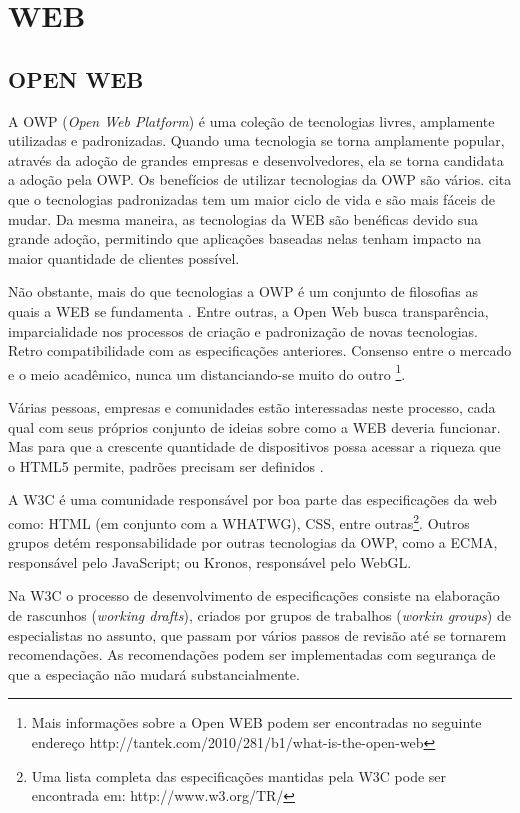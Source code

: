 \section{WEB}

\subsection{OPEN WEB}

A OWP (\textit{Open Web Platform}) é uma coleção de tecnologias
livres, amplamente utilizadas e padronizadas. Quando uma tecnologia
se torna amplamente popular, através da adoção de grandes empresas
e desenvolvedores, ela se torna candidata a adoção pela OWP. Os
benefícios de utilizar tecnologias da OWP são vários. \cite[pp.
3]{svgTime} cita que o tecnologias padronizadas tem um maior ciclo de
vida e são mais fáceis de mudar. Da mesma maneira, as tecnologias
da WEB são benéficas devido sua grande adoção, permitindo que
aplicações baseadas nelas tenham impacto na maior quantidade de
clientes possível.

Não obstante, mais do que tecnologias a OWP é um conjunto de
filosofias as quais a WEB se fundamenta \autocite{openWebDefinition}. Entre outras, a Open Web
busca transparência, imparcialidade nos processos de criação
e padronização de novas tecnologias. Retro compatibilidade com
as especificações anteriores. Consenso entre o mercado e o meio
acadêmico, nunca um distanciando-se muito do outro \footnote{Mais
informações sobre a Open WEB podem ser encontradas no seguinte
endereço http://tantek.com/2010/281/b1/what-is-the-open-web}.

Várias pessoas, empresas e comunidades estão interessadas neste
processo, cada qual com seus próprios conjunto de ideias sobre como
a WEB deveria funcionar. Mas para que a crescente quantidade de
dispositivos possa acessar a riqueza que o HTML5 permite, padrões
precisam ser definidos \autocite[pp. 5]{aSeriousContender}.

A W3C é uma comunidade responsável por boa parte das
especificações da web como: HTML (em conjunto com a WHATWG), CSS,
entre outras\footnote{Uma lista completa das especificações mantidas pela
W3C pode ser encontrada em: http://www.w3.org/TR/}. Outros grupos
detém responsabilidade por outras tecnologias da OWP, como a ECMA,
responsável pelo JavaScript; ou Kronos, responsável pelo WebGL.

Na W3C o processo de desenvolvimento de especificações consiste
na elaboração de rascunhos (\textit{working drafts}), criados por grupos
de trabalhos (\textit{workin groups}) de especialistas no
assunto, que passam por vários passos de revisão até se tornarem
recomendações. As recomendações podem ser implementadas com
segurança de que a especiação não mudará substancialmente.

